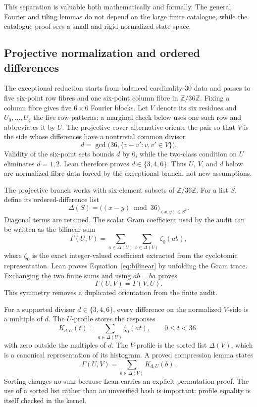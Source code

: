 \documentclass[10pt,twocolumn]{article}
\theoremstyle{definition}
\theoremstyle{remark}
\newcommand{\Z}{\mathbb Z}
\newcommand{\Zmod}[1]{\Z/#1\Z}
\begin{document}
This separation is valuable both mathematically and formally.  The general
Fourier and tiling lemmas do not depend on the large finite catalogue, while
the catalogue proof sees a small and rigid normalized state space.

\subsection{Projective normalization and ordered differences}

The exceptional reduction starts from balanced cardinality-$30$ data and
passes to five six-point row fibres and one six-point column fibre in
$\Zmod{36}$.  Fixing a column fibre gives five $6\times6$ Fourier blocks.
Let $V$ denote its six residues and $U_0,\ldots,U_4$ the five row patterns; a
marginal check below uses one such row and abbreviates it by $U$.
The projective-cover alternative orients the pair so that $V$ is the side
whose differences have a nontrivial common divisor
\[
  d=\gcd\bigl(36,\{v-v':v,v'\in V\}\bigr).
\]
Validity of the six-point sets bounds $d$ by $6$, while the two-class
condition on $U$ eliminates $d=1,2$.  Lean therefore proves
$d\in\{3,4,6\}$.  Thus $U$, $V$, and $d$ below are normalized fibre data
forced by the exceptional branch, not new assumptions.

The projective branch works with six-element subsets of $\Zmod{36}$.  For a
list $S$, define its ordered-difference list
\[
  \Delta(S)=\bigl((x-y)\bmod 36\bigr)_{(x,y)\in S^2}.
\]
Diagonal terms are retained.  The scalar Gram coefficient used by the audit
can be written as the bilinear sum
\begin{equation}\label{eq:bilinear}
  \Gamma(U,V)
  =\sum_{a\in\Delta(U)}\sum_{b\in\Delta(V)}\zeta_0(ab),
\end{equation}
where $\zeta_0$ is the exact integer-valued coefficient extracted from the
cyclotomic representation.  Lean proves Equation~\eqref{eq:bilinear} by
unfolding the Gram trace.  Exchanging the two finite sums and using
$ab=ba$ proves
\[
  \Gamma(U,V)=\Gamma(V,U).
\]
This symmetry removes a duplicated orientation from the finite audit.

For a supported divisor $d\in\{3,4,6\}$, every difference on the normalized
$V$-side is a multiple of $d$.  The $U$-profile stores the responses
\[
  K_{d,U}(t)=\sum_{a\in\Delta(U)}\zeta_0(at),
  \qquad 0\le t<36,
\]
with zero outside the multiples of $d$.  The $V$-profile is the sorted list
$\Delta(V)$, which is a canonical representation of its histogram.  A proved
compression lemma states
\begin{equation}\label{eq:profile}
  \Gamma(U,V)=\sum_{b\in\Delta(V)}K_{d,U}(b).
\end{equation}
Sorting changes no sum because Lean carries an explicit permutation proof.
The use of a sorted list rather than an unverified hash is important: profile
equality is itself checked in the kernel.
\end{document}
